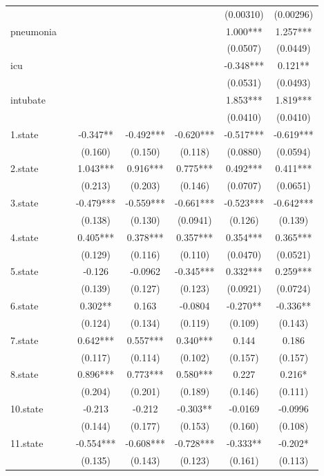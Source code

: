 \documentclass[]{article}
\begin{document}
\begin{tabular}{lcccccc}
 &  &  &  &  & (0.00310) & (0.00296) \\
pneumonia &  &  &  &  & 1.000*** & 1.257*** \\
 &  &  &  &  & (0.0507) & (0.0449) \\
icu &  &  &  &  & -0.348*** & 0.121** \\
 &  &  &  &  & (0.0531) & (0.0493) \\
intubate &  &  &  &  & 1.853*** & 1.819*** \\
 &  &  &  &  & (0.0410) & (0.0410) \\
1.state &  & -0.347** & -0.492*** & -0.620*** & -0.517*** & -0.619*** \\
 &  & (0.160) & (0.150) & (0.118) & (0.0880) & (0.0594) \\
2.state &  & 1.043*** & 0.916*** & 0.775*** & 0.492*** & 0.411*** \\
 &  & (0.213) & (0.203) & (0.146) & (0.0707) & (0.0651) \\
3.state &  & -0.479*** & -0.559*** & -0.661*** & -0.523*** & -0.642*** \\
 &  & (0.138) & (0.130) & (0.0941) & (0.126) & (0.139) \\
4.state &  & 0.405*** & 0.378*** & 0.357*** & 0.354*** & 0.365*** \\
 &  & (0.129) & (0.116) & (0.110) & (0.0470) & (0.0521) \\
5.state &  & -0.126 & -0.0962 & -0.345*** & 0.332*** & 0.259*** \\
 &  & (0.139) & (0.127) & (0.123) & (0.0921) & (0.0724) \\
6.state &  & 0.302** & 0.163 & -0.0804 & -0.270** & -0.336** \\
 &  & (0.124) & (0.134) & (0.119) & (0.109) & (0.143) \\
7.state &  & 0.642*** & 0.557*** & 0.340*** & 0.144 & 0.186 \\
 &  & (0.117) & (0.114) & (0.102) & (0.157) & (0.157) \\
8.state &  & 0.896*** & 0.773*** & 0.580*** & 0.227 & 0.216* \\
 &  & (0.204) & (0.201) & (0.189) & (0.146) & (0.111) \\
10.state &  & -0.213 & -0.212 & -0.303** & -0.0169 & -0.0996 \\
 &  & (0.144) & (0.177) & (0.153) & (0.160) & (0.108) \\
11.state &  & -0.554*** & -0.608*** & -0.728*** & -0.333** & -0.202* \\
 &  & (0.135) & (0.143) & (0.123) & (0.161) & (0.113) \\

\end{tabular}
\end{document}
